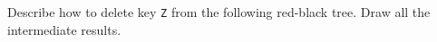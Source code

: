 

Describe how to delete key {\tt Z} from the following red-black tree.
Draw all the intermediate results.

\begin{figure}[h]
\centerline{}\end{figure}

